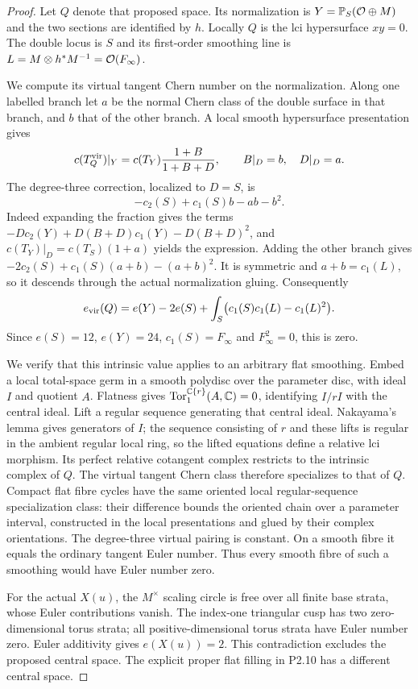 \begin{proof}
Let $Q$ denote that proposed space. Its normalization is $Y=\mathbb P_S(\mathcal O\oplus M)$ and the two sections are identified by $h$. Locally $Q$ is the lci hypersurface $xy=0$. The double locus is $S$ and its first-order smoothing line is $L=M\otimes h^*M^{-1}=\mathcal O(F_\infty)$.

We compute its virtual tangent Chern number on the normalization. Along one labelled branch let $a$ be the normal Chern class of the double surface in that branch, and $b$ that of the other branch. A local smooth hypersurface presentation gives
\[
 c(T_Q^{\mathrm{vir}})|_Y=c(T_Y)\frac{1+B}{1+B+D},\qquad B|_D=b,\quad D|_D=a.
\]
The degree-three correction, localized to $D=S$, is
\[
 -c_2(S)+c_1(S)b-ab-b^2.
\]
Indeed expanding the fraction gives the terms $-Dc_2(Y)+D(B+D)c_1(Y)-D(B+D)^2$, and $c(T_Y)|_D=c(T_S)(1+a)$ yields the expression. Adding the other branch gives $-2c_2(S)+c_1(S)(a+b)-(a+b)^2$. It is symmetric and $a+b=c_1(L)$, so it descends through the actual normalization gluing. Consequently
\[
 e_{\mathrm{vir}}(Q)=e(Y)-2e(S)+\int_S\bigl(c_1(S)c_1(L)-c_1(L)^2\bigr).
\]
Since $e(S)=12$, $e(Y)=24$, $c_1(S)=F_\infty$ and $F_\infty^2=0$, this is zero.

We verify that this intrinsic value applies to an arbitrary flat smoothing. Embed a local total-space germ in a smooth polydisc over the parameter disc, with ideal $I$ and quotient $A$. Flatness gives $\operatorname{Tor}_1^{\mathbb C\{r\}}(A,\mathbb C)=0$, identifying $I/rI$ with the central ideal. Lift a regular sequence generating that central ideal. Nakayama's lemma gives generators of $I$; the sequence consisting of $r$ and these lifts is regular in the ambient regular local ring, so the lifted equations define a relative lci morphism. Its perfect relative cotangent complex restricts to the intrinsic complex of $Q$. The virtual tangent Chern class therefore specializes to that of $Q$. Compact flat fibre cycles have the same oriented local regular-sequence specialization class: their difference bounds the oriented chain over a parameter interval, constructed in the local presentations and glued by their complex orientations. The degree-three virtual pairing is constant. On a smooth fibre it equals the ordinary tangent Euler number. Thus every smooth fibre of such a smoothing would have Euler number zero.

For the actual $X(u)$, the $M^\times$ scaling circle is free over all finite base strata, whose Euler contributions vanish. The index-one triangular cusp has two zero-dimensional torus strata; all positive-dimensional torus strata have Euler number zero. Euler additivity gives $e(X(u))=2$. This contradiction excludes the proposed central space. The explicit proper flat filling in P2.10 has a different central space.
\end{proof}

